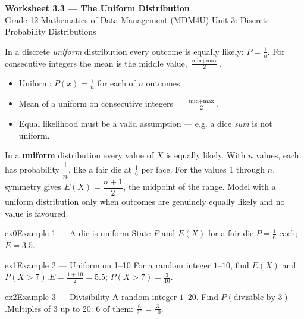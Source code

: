 \documentclass[11pt]{article}
\begin{document}
\begin{center}
{\LARGE\bfseries\color{titleblue}Worksheet 3.3 --- The Uniform Distribution}\\[2pt]
{\small Grade 12 Mathematics of Data Management (MDM4U) \textperiodcentered{} Unit 3: Discrete Probability Distributions}
\end{center}

\begin{ideabox}
In a discrete \emph{uniform} distribution every outcome is equally likely: $P=\tfrac1n$. For consecutive integers the mean is the middle value, $\tfrac{\text{min}+\text{max}}{2}$.
\begin{itemize}[leftmargin=*,itemsep=2pt]
  \item Uniform: $P(x)=\tfrac1n$ for each of $n$ outcomes.
  \item Mean of a uniform on consecutive integers $=\tfrac{\text{min}+\text{max}}{2}$.
  \item Equal likelihood must be a valid assumption --- e.g. a dice \emph{sum} is not uniform.
\end{itemize}
\end{ideabox}

\begin{learnbox}
In a \textbf{uniform} distribution every value of $X$ is equally likely. With $n$ values, each has probability $\dfrac1n$, like a fair die at $\tfrac16$ per face.
For the values $1$ through $n$, symmetry gives $E(X)=\dfrac{n+1}{2}$, the midpoint of the range.
Model with a uniform distribution only when outcomes are genuinely equally likely and no value is favoured.
\end{learnbox}


\begin{example}{ex0}{Example 1 --- A die is uniform}
State $P$ and $E(X)$ for a fair die.\soln $P=\tfrac16$ each; $E=3.5$.
\end{example}

\begin{example}{ex1}{Example 2 --- Uniform on 1--10}
For a random integer $1$--$10$, find $E(X)$ and $P(X>7)$.\soln $E=\tfrac{1+10}{2}=5.5$; $P(X>7)=\tfrac{3}{10}$.
\end{example}

\begin{example}{ex2}{Example 3 --- Divisibility}
A random integer $1$--$20$. Find $P(\text{divisible by }3)$.\soln Multiples of 3 up to 20: $6$ of them: $\tfrac{6}{20}=\tfrac{3}{10}$.
\end{example}
\end{document}
